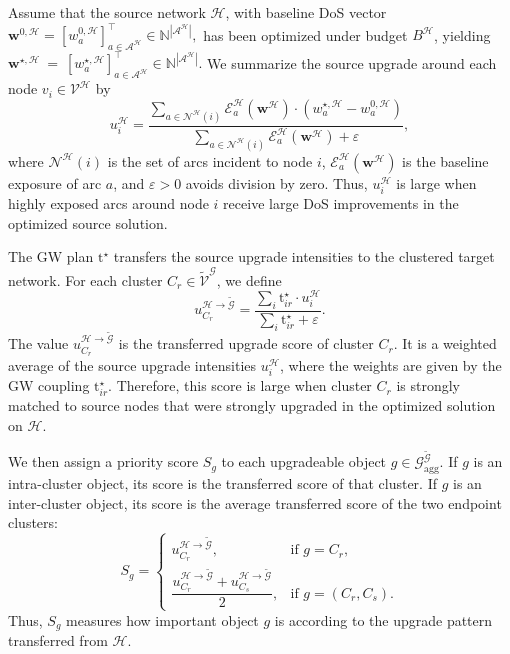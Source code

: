 \documentclass[lettersize,journal]{IEEEtran}
\begin{document}
Assume that the source network $\mathcal{H}$, with baseline DoS vector
$\mathbf{w}^{0,\mathcal{H}}
=
\left[
w_a^{0,\mathcal{H}}
\right]_{a\in\mathcal{A}^{\mathcal{H}}}^{\top}
\in
\mathbb{N}^{|\mathcal{A}^{\mathcal{H}}|},$
has been optimized under budget $B^{\mathcal{H}}$, yielding $\mathbf{w}^{\star,\mathcal{H}}
~=~
\left[
w_a^{\star,\mathcal{H}}
\right]_{a\in\mathcal{A}^{\mathcal{H}}}^{\top}
\in
\mathbb{N}^{|\mathcal{A}^{\mathcal{H}}|}.$
We summarize the source upgrade around each node
$v_i\in\mathcal{V}^{\mathcal{H}}$ by
\begin{equation}
\label{eq:source_upgrade_intensity}
u_i^{\mathcal{H}}
=
\frac{
\sum_{a\in\mathcal{N}^{\mathcal{H}}(i)}
\mathcal{E}_a^{\mathcal{H}}(\mathbf{w}^{\mathcal{H}})
\cdot
\left(
w_a^{\star,\mathcal{H}}
-
w_a^{0,\mathcal{H}}
\right)
}{
\sum_{a\in\mathcal{N}^{\mathcal{H}}(i)}
\mathcal{E}_a^{\mathcal{H}}(\mathbf{w}^{\mathcal{H}})
+
\varepsilon
},
\end{equation}
where $\mathcal{N}^{\mathcal{H}}(i)$ is the set of arcs incident to node $i$,
$\mathcal{E}_a^{\mathcal{H}}(\mathbf{w}^{\mathcal{H}})$ is the baseline exposure
of arc $a$, and $\varepsilon>0$ avoids division by zero. Thus,
$u_i^{\mathcal{H}}$ is large when highly exposed arcs around node $i$ receive
large DoS improvements in the optimized source solution.

The GW plan $\mathrm{t}^{\star}$ transfers the source upgrade intensities to the
clustered target network. For each cluster
$C_r\in\tilde{\mathcal{V}}^{\mathcal{G}}$, we define
\begin{equation}
\label{eq:target_transfer_score_cluster}
u_{C_r}^{\mathcal{H}\rightarrow\tilde{\mathcal{G}}}
=
\frac{
\sum_i
\mathrm{t}_{ir}^{\star}
\cdot
u_i^{\mathcal{H}}
}{
\sum_i
\mathrm{t}_{ir}^{\star}
+
\varepsilon
}.
\end{equation}
The value $u_{C_r}^{\mathcal{H}\rightarrow\tilde{\mathcal{G}}}$ is the
transferred upgrade score of cluster $C_r$. It is a weighted average of the
source upgrade intensities $u_i^{\mathcal{H}}$, where the weights are given by
the GW coupling $\mathrm{t}_{ir}^{\star}$. Therefore, this score is large when
cluster $C_r$ is strongly matched to source nodes that were strongly upgraded in
the optimized solution on $\mathcal{H}$.

We then assign a priority score $S_g$ to each upgradeable object
$g\in\mathcal{G}_{\mathrm{agg}}^{\tilde{\mathcal{G}}}$. If $g$ is an
intra-cluster object, its score is the transferred score of that cluster. If
$g$ is an inter-cluster object, its score is the average transferred score of
the two endpoint clusters:
\begin{equation}
\label{eq:object_priority_score}
S_g
=
\begin{cases}
u_{C_r}^{\mathcal{H}\rightarrow\tilde{\mathcal{G}}},
& \text{if } g=C_r, \\[0.5em]
\dfrac{
u_{C_r}^{\mathcal{H}\rightarrow\tilde{\mathcal{G}}}
+
u_{C_s}^{\mathcal{H}\rightarrow\tilde{\mathcal{G}}}
}{2},
& \text{if } g=(C_r,C_s).
\end{cases}
\end{equation}
Thus, $S_g$ measures how important object $g$ is according to the upgrade
pattern transferred from $\mathcal{H}$.
\end{document}
